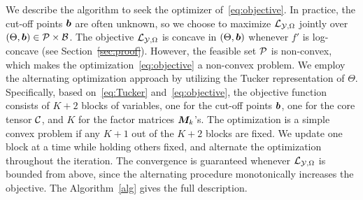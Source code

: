 \documentclass[11pt]{article}
\theoremstyle{plain}
\theoremstyle{definition}
\providecommand{\DIFaddtex}[1]{{\protect\color{blue}\uwave{#1}}} %
\providecommand{\DIFdeltex}[1]{{\protect\color{red}\sout{#1}}}                      %
\providecommand{\DIFaddbegin}{} %
\providecommand{\DIFaddend}{} %
\providecommand{\DIFdelbegin}{} %
\providecommand{\DIFdelend}{} %
\providecommand{\DIFadd}[1]{\texorpdfstring{\DIFaddtex{#1}}{#1}} %
\providecommand{\DIFdel}[1]{\texorpdfstring{\DIFdeltex{#1}}{}} %
\begin{document}
We describe the algorithm to seek the optimizer of~\eqref{eq:objective}. In practice, the cut-off points $\bm{b}$ are often unknown, so we choose to maximize $\mathcal{L}_{\mathcal{Y},\Omega}$ jointly over $(\Theta,\bm{b})\in\mathcal{P}\times \mathcal{B}$. The objective $\mathcal{L}_{\mathcal{Y},\Omega}$ is concave in $(\Theta,\bm{b})$ whenever $f'$ is log-concave (see Section~\DIFdelbegin \DIFdel{\ref{sec:proof}}\DIFdelend \DIFaddbegin \DIFadd{\ref{sec:proofconvexity}}\DIFaddend ). However, the feasible set $\mathcal{P}$ is non-convex, which makes the optimization~\eqref{eq:objective} a non-convex problem. We employ the alternating optimization approach by utilizing the Tucker representation of $\Theta$. Specifically, based on~\eqref{eq:Tucker} and~\eqref{eq:objective}, the objective function consists of $K+2$ blocks of variables, one for the cut-off points $\bm{b}$, one for the core tensor $\mathcal{C}$, and $K$ for the factor matrices $\bm M_k$'s. The optimization is a simple convex problem if any $K+1$ out of the $K+2$ blocks are fixed. We update one block at a time while holding others fixed, and alternate the optimization throughout the iteration. The convergence is guaranteed whenever $\mathcal{L}_{\mathcal{Y},\Omega}$ is bounded from above, since the alternating procedure monotonically increases the objective. The Algorithm~\ref{alg} gives the full description.
\end{document}
